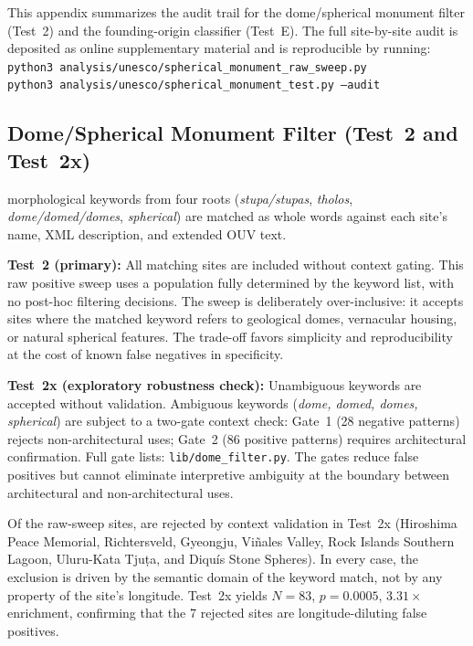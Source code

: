 \documentclass[12pt,a4paper]{article}
\begin{document}
This appendix summarizes the audit trail for the dome/spherical monument
filter (Test~2) and the founding-origin classifier (Test~E).
The full site-by-site audit is deposited as online supplementary material
and is reproducible by running:\\
\texttt{python3 analysis/unesco/spherical\_monument\_raw\_sweep.py}\\
\texttt{python3 analysis/unesco/spherical\_monument\_test.py --audit}

\subsection{Dome/Spherical Monument Filter (Test~2 and Test~2x)}
\label{sec:kwdaudit_dome}

\NcircKeywords{} morphological keywords from four roots
(\textit{stupa/stupas}, \textit{tholos}, \textit{dome/domed/domes},
\textit{spherical}) are matched as whole words against each site's
name, XML description, and extended OUV text.

\textbf{Test~2 (primary):} All \NcircTotal{} matching sites are included
without context gating. This raw positive sweep uses a population fully
determined by the keyword list, with no post-hoc filtering decisions.
The sweep is deliberately over-inclusive: it accepts sites where the
matched keyword refers to geological domes, vernacular housing, or
natural spherical features. The trade-off favors simplicity and
reproducibility at the cost of known false negatives in specificity.

\textbf{Test~2x (exploratory robustness check):} Unambiguous keywords
are accepted without validation. Ambiguous keywords (\textit{dome, domed,
domes, spherical}) are subject to a two-gate context check: Gate~1
(28 negative patterns) rejects non-architectural uses; Gate~2
(86 positive patterns) requires architectural confirmation. Full gate
lists: \texttt{lib/dome\_filter.py}. The gates reduce false positives
but cannot eliminate interpretive ambiguity at the boundary between
architectural and non-architectural uses.

Of the \NcircTotal{} raw-sweep sites, \NcircContextRejected{} are
rejected by context validation in Test~2x (Hiroshima Peace Memorial,
Richtersveld, Gyeongju, Vi\~{n}ales Valley, Rock Islands Southern Lagoon,
Uluru-Kata Tju\d{t}a, and Diqu\'{i}s Stone Spheres). In every case, the
exclusion is driven by the semantic domain of the keyword match, not by
any property of the site's longitude. Test~2x yields $N = 83$,
$p = 0.0005$, $3.31\times$ enrichment, confirming that the 7 rejected
sites are longitude-diluting false positives.
\end{document}
